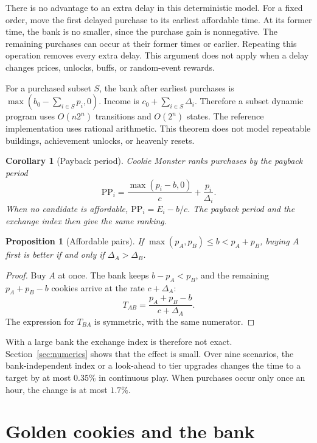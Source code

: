 \documentclass[11pt,a4paper]{article}
\numberwithin{equation}{section}
\newtheorem{proposition}[theorem]{Proposition}
\newtheorem{corollary}[theorem]{Corollary}
\theoremstyle{definition}
\theoremstyle{remark}
\begin{document}
There is no advantage to an extra delay in this deterministic model. For a fixed order, move the first delayed purchase to its earliest affordable time. At its former time, the bank is no smaller, since the purchase gain is nonnegative. The remaining purchases can occur at their former times or earlier. Repeating this operation removes every extra delay. This argument does not apply when a delay changes prices, unlocks, buffs, or random-event rewards.

For a purchased subset $S$, the bank after earliest purchases is $\max(b_0-\sum_{i\in S}p_i,0)$. Income is $c_0+\sum_{i\in S}\Delta_i$. Therefore a subset dynamic program uses $O(n2^n)$ transitions and $O(2^n)$ states. The reference implementation uses rational arithmetic. This theorem does not model repeatable buildings, achievement unlocks, or heavenly resets.

\begin{corollary}[Payback period]\label{cor:pp}
Cookie Monster ranks purchases by the payback period
\begin{equation}\label{eq:pp}
 \mathrm{PP}_i=\frac{\max(p_i-b,0)}c+\frac{p_i}{\Delta_i}.
\end{equation}
When no candidate is affordable, $\mathrm{PP}_i=E_i-b/c$. The payback period and the exchange index then give the same ranking.
\end{corollary}

\begin{proposition}[Affordable pairs]\label{prop:affordable}
If $\max(p_A,p_B)\le b<p_A+p_B$, buying $A$ first is better if and only if $\Delta_A>\Delta_B$.
\end{proposition}

\begin{proof}
Buy $A$ at once. The bank keeps $b-p_A<p_B$, and the remaining $p_A+p_B-b$ cookies arrive at the rate $c+\Delta_A$:
\[
 T_{AB}=\frac{p_A+p_B-b}{c+\Delta_A}.
\]
The expression for $T_{BA}$ is symmetric, with the same numerator.
\end{proof}

With a large bank the exchange index is therefore not exact. Section~\ref{sec:numerics} shows that the effect is small. Over nine scenarios, the bank-independent index or a look-ahead to tier upgrades changes the time to a target by at most $0.35\%$ in continuous play. When purchases occur only once an hour, the change is at most $1.7\%$.

\section{Golden cookies and the bank}\label{sec:golden}
\end{document}
